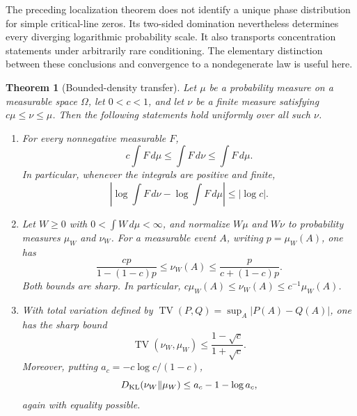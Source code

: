 \documentclass[11pt,letterpaper]{article}
\newtheorem{theorem}{Theorem}[section]
\theoremstyle{definition}
\theoremstyle{remark}
\newcommand{\1}{\mathbf 1}
\begin{document}
The preceding localization theorem does not identify a unique phase
distribution for simple critical-line zeros.  Its two-sided domination
nevertheless determines every diverging logarithmic probability scale.
It also transports concentration statements under arbitrarily rare
conditioning.  The elementary distinction between these conclusions
and convergence to a nondegenerate law is useful here.

\begin{theorem}[Bounded-density transfer]\label{p04:thm:bounded-transfer}
Let $\mu$ be a probability measure on a measurable space $\Omega$,
let $0<c<1$, and let $\nu$ be a finite measure satisfying
$c\mu\le\nu\le\mu$.  Then the following statements hold uniformly
over all such $\nu$.
\begin{enumerate}[label=\textup{(\roman*)}]
\item For every nonnegative measurable $F$,
\[
 c\int F\,d\mu\le\int F\,d\nu\le\int F\,d\mu.
\]
In particular, whenever the integrals are positive and finite,
\[
 \left|\log\int F\,d\nu-\log\int F\,d\mu\right|
 \le |\log c|.
\]
\item Let $W\ge0$ with $0<\int W\,d\mu<\infty$, and normalize
$W\mu$ and $W\nu$ to probability measures $\mu_W$ and $\nu_W$.
For a measurable event $A$, writing $p=\mu_W(A)$, one has
\begin{equation}\label{p04:eq:conditioned-sharp-bounds}
 \frac{cp}{1-(1-c)p}\le\nu_W(A)
 \le\frac{p}{c+(1-c)p}.
\end{equation}
Both bounds are sharp.  In particular,
$c\mu_W(A)\le\nu_W(A)\le c^{-1}\mu_W(A)$.
\item With total variation defined by
$\operatorname{TV}(P,Q)=\sup_A|P(A)-Q(A)|$, one has the sharp bound
\begin{equation}\label{p04:eq:sharp-TV-transfer}
 \operatorname{TV}(\nu_W,\mu_W)
 \le\frac{1-\sqrt c}{1+\sqrt c}.
\end{equation}
Moreover, putting $a_c=-c\log c/(1-c)$,
\begin{equation}\label{p04:eq:sharp-KL-transfer}
 D_{\rm KL}(\nu_W\Vert\mu_W)
 \le a_c-1-\log a_c,
\end{equation}
again with equality possible.
\end{enumerate}
\end{theorem}
\end{document}
